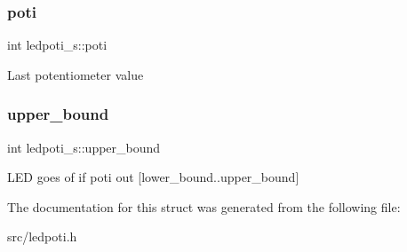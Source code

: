 \subsubsection{\texorpdfstring{poti}{poti}}
{\footnotesize\ttfamily int ledpoti\+\_\+s\+::poti}

Last potentiometer value \mbox{\label{structledpoti__s_a13828b9c632c6ad2497be31aeeaa991b}} 
\subsubsection{\texorpdfstring{upper\+\_\+bound}{upper\_bound}}
{\footnotesize\ttfamily int ledpoti\+\_\+s\+::upper\+\_\+bound}

L\+ED goes of if poti out \mbox{[}lower\+\_\+bound..upper\+\_\+bound\mbox{]} 

The documentation for this struct was generated from the following file\+:\begin{DoxyCompactItemize}
\item 
src/ledpoti.\+h\end{DoxyCompactItemize}
